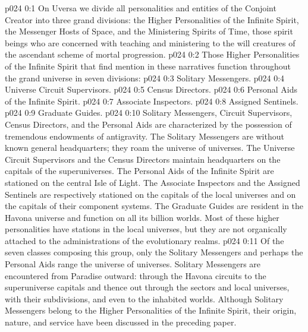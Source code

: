 \author{Divine Counselor}
\vs p024 0:1 On Uversa we divide all personalities and entities of the Conjoint Creator into three grand divisions: the Higher Personalities of the Infinite Spirit, the Messenger Hosts of Space, and the Ministering Spirits of Time, those spirit beings who are concerned with teaching and ministering to the will creatures of the ascendant scheme of mortal progression.
\pc \vs p024 0:2 Those Higher Personalities of the Infinite Spirit that find mention in these narratives function throughout the grand universe in seven divisions:
\pc \vs p024 0:3 \bibnobreakspace Solitary Messengers.
\vs p024 0:4 \bibnobreakspace Universe Circuit Supervisors.
\vs p024 0:5 \bibnobreakspace Census Directors.
\vs p024 0:6 \bibnobreakspace Personal Aids of the Infinite Spirit.
\vs p024 0:7 \bibnobreakspace Associate Inspectors.
\vs p024 0:8 \bibnobreakspace Assigned Sentinels.
\vs p024 0:9 \bibnobreakspace Graduate Guides.
\pc \vs p024 0:10 Solitary Messengers, Circuit Supervisors, Census Directors, and the Personal Aids are characterized by the possession of tremendous endowments of antigravity. The Solitary Messengers are without known general headquarters; they roam the universe of universes. The Universe Circuit Supervisors and the Census Directors maintain headquarters on the capitals of the superuniverses. The Personal Aids of the Infinite Spirit are stationed on the central Isle of Light. The Associate Inspectors and the Assigned Sentinels are respectively stationed on the capitals of the local universes and on the capitals of their component systems. The Graduate Guides are resident in the Havona universe and function on all its billion worlds. Most of these higher personalities have stations in the local universes, but they are not organically attached to the administrations of the evolutionary realms.\plusone
\vs p024 0:11 Of the seven classes composing this group, only the Solitary Messengers and perhaps the Personal Aids range the universe of universes. Solitary Messengers are encountered from Paradise outward: through the Havona circuits to the superuniverse capitals and thence out through the sectors and local universes, with their subdivisions, and even to the inhabited worlds. Although Solitary Messengers belong to the Higher Personalities of the Infinite Spirit, their origin, nature, and service have been discussed in the preceding paper.

